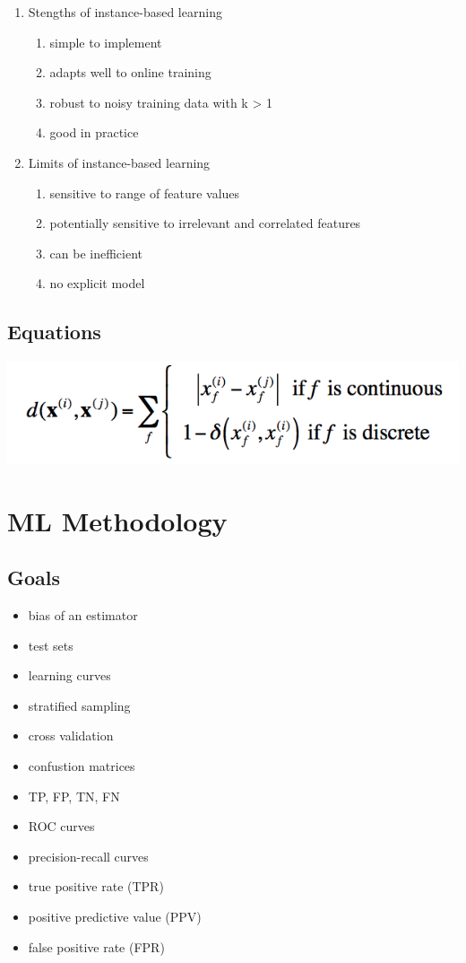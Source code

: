 \documentclass[a4paper]{article}
\begin{document}
\begin{enumerate}
\item Stengths of instance-based learning
  \begin{enumerate}
  \item simple to implement
  \item adapts well to online training
  \item robust to noisy training data with k > 1
  \item good in practice
  \end{enumerate}
\item Limits of instance-based learning
  \begin{enumerate}
  \item sensitive to range of feature values
  \item potentially sensitive to irrelevant and correlated features
  \item can be inefficient
  \item no explicit model
  \end{enumerate}
  
\end{enumerate}

\subsection{Equations}

\includegraphics{dist}

\section{ML Methodology}
\subsection{Goals}
\begin{itemize}
\item bias of an estimator
\item test sets
\item learning curves
\item stratified sampling
\item cross validation
\item confustion matrices
\item TP, FP, TN, FN
\item ROC curves
\item precision-recall curves
\item true positive rate (TPR)
\item positive predictive value (PPV)
\item false positive rate (FPR)
\end{itemize}
\end{document}
